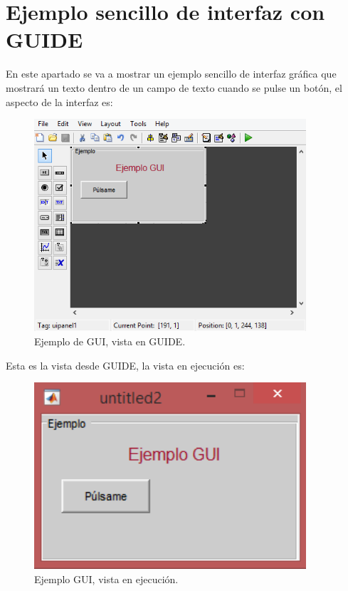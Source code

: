 \section{Ejemplo sencillo de interfaz con GUIDE}

En este apartado se va a mostrar un ejemplo sencillo de interfaz gráfica que mostrará un texto dentro de un campo de texto cuando se pulse un botón, el aspecto de la interfaz es:
\bigskip

\begin{figure}[H]
\centering
\includegraphics[width=0.9\textwidth]{imagenes/figuras/6_4.png}
\caption{Ejemplo de GUI, vista en GUIDE.}
\end{figure}
\bigskip

Esta es la vista desde GUIDE, la vista en ejecución es:
\bigskip

\begin{figure}[H]
\centering
\includegraphics[width=0.9\textwidth]{imagenes/figuras/6_5.png}
\caption{Ejemplo GUI, vista en ejecución.}
\end{figure}
\bigskip

